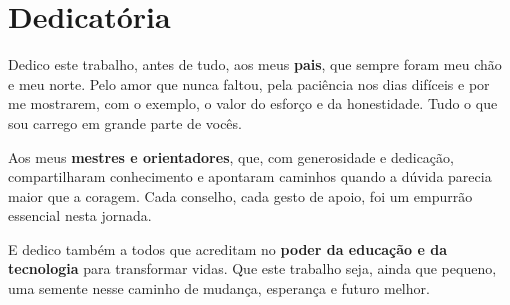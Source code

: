\chapter*{Dedicatória}

Dedico este trabalho, antes de tudo, aos meus \textbf{pais}, que sempre foram meu chão e meu norte. Pelo amor que nunca faltou, pela paciência nos dias difíceis e por me mostrarem, com o exemplo, o valor do esforço e da honestidade. Tudo o que sou carrego em grande parte de vocês.

Aos meus \textbf{mestres e orientadores}, que, com generosidade e dedicação, compartilharam conhecimento e apontaram caminhos quando a dúvida parecia maior que a coragem. Cada conselho, cada gesto de apoio, foi um empurrão essencial nesta jornada.

E dedico também a todos que acreditam no \textbf{poder da educação e da tecnologia} para transformar vidas. Que este trabalho seja, ainda que pequeno, uma semente nesse caminho de mudança, esperança e futuro melhor.